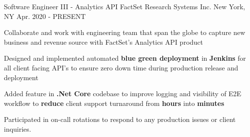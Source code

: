 

\begin{cventries}

  \cventry
    {Software Engineer III - Analytics API} %
    {FactSet Research Systems Inc.} %
    {New York, NY} %
    {Apr. 2020 - PRESENT} %
    {
      \begin{cvitems} %
        \item Collaborate and work with engineering team that span the globe to capture new business and revenue source with FactSet's Analytics API product
        \item Designed and implemented automated \textbf{blue green deployment} in \textbf{Jenkins} for all client facing API's to ensure zero down time during production release and deployment
        \item Added feature in \textbf{.Net Core} codebase to improve logging and visibility of E2E workflow to \textbf{reduce} client support turnaround from \textbf{hours} into \textbf{minutes}
        \item Participated in on-call rotations to respond to any production issues or client inquiries. 
      \end{cvitems}
    }


\end{cventries}
